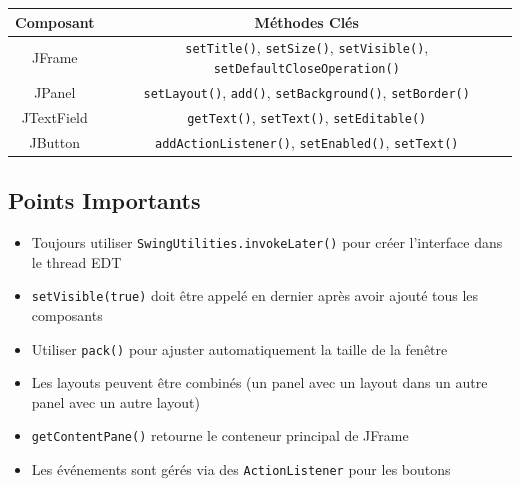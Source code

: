 \documentclass[11pt,a4paper]{article}
\begin{document}
\begin{table}[h]
\centering
\begin{tabular}{|c|c|}
\hline
\textbf{Composant} & \textbf{Méthodes Clés} \\
\hline
JFrame & \texttt{setTitle()}, \texttt{setSize()}, \texttt{setVisible()}, \texttt{setDefaultCloseOperation()} \\
\hline
JPanel & \texttt{setLayout()}, \texttt{add()}, \texttt{setBackground()}, \texttt{setBorder()} \\
\hline
JTextField & \texttt{getText()}, \texttt{setText()}, \texttt{setEditable()} \\
\hline
JButton & \texttt{addActionListener()}, \texttt{setEnabled()}, \texttt{setText()} \\
\hline
\end{tabular}
\end{table}

\subsection{Points Importants}

\begin{itemize}
    \item Toujours utiliser \texttt{SwingUtilities.invokeLater()} pour créer l'interface dans le thread EDT
    \item \texttt{setVisible(true)} doit être appelé en dernier après avoir ajouté tous les composants
    \item Utiliser \texttt{pack()} pour ajuster automatiquement la taille de la fenêtre
    \item Les layouts peuvent être combinés (un panel avec un layout dans un autre panel avec un autre layout)
    \item \texttt{getContentPane()} retourne le conteneur principal de JFrame
    \item Les événements sont gérés via des \texttt{ActionListener} pour les boutons
\end{itemize}
\end{document}
